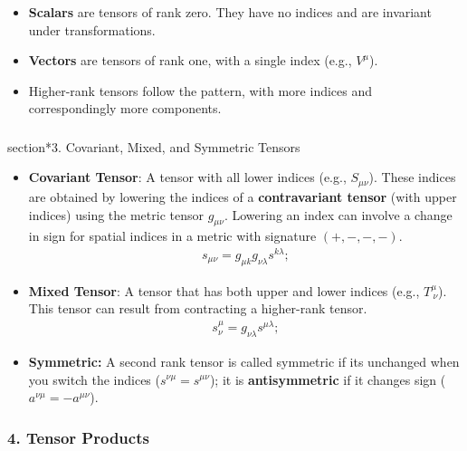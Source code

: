 \documentclass[12pt]{book}
\begin{document}
                \begin{itemize}
                    \item \textbf{Scalars} are tensors of rank zero. They have no indices and are invariant under transformations.
                    \item \textbf{Vectors} are tensors of rank one, with a single index (e.g., \( V^\mu \)).
                    \item Higher-rank tensors follow the pattern, with more indices and correspondingly more components.
                \end{itemize}
            
            \subsubsection{}section*{3. Covariant, Mixed, and Symmetric Tensors}
            
                \begin{itemize}
                    \item \textbf{Covariant Tensor}: A tensor with all lower indices (e.g., \( S_{\mu \nu} \)). These indices are obtained by lowering the indices of a \textbf{contravariant tensor} (with upper indices) using the metric tensor \( g_{\mu \nu} \). Lowering an index can involve a change in sign for spatial indices in a metric with signature \((+, -, -, -)\).
                    \begin{align}
                        s_{\mu \nu} = g_{\mu k} g_{\nu \lambda} s^{k \lambda};
                    \end{align}
                    \item \textbf{Mixed Tensor}: A tensor that has both upper and lower indices (e.g., \( T^{\mu}_{\ \nu} \)). This tensor can result from contracting a higher-rank tensor.
                    \begin{align}
                        s^{\mu}_{\nu} = g_{\nu \lambda} s^{\mu \lambda};
                    \end{align}
                    \item \textbf{Symmetric:} A second rank tensor is called symmetric if its unchanged when you switch the indices (\(s^{\nu \mu}=s^{\mu \nu}\)); it is \textbf{antisymmetric} if it changes sign (\(a^{\nu \mu}=-a^{\mu \nu}\)).
                \end{itemize}
            
            \subsubsection{4. Tensor Products}
            
\end{document}
